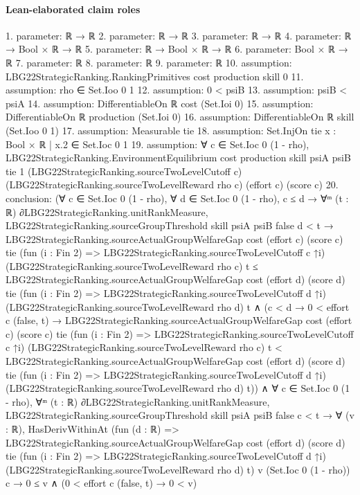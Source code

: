 \documentclass[10pt]{article}
\begin{document}
\paragraph{Lean-elaborated claim roles}\begin{ReviewVerbatim}
1. parameter: ℝ → ℝ
2. parameter: ℝ → ℝ
3. parameter: ℝ → ℝ
4. parameter: ℝ → Bool × ℝ → ℝ
5. parameter: ℝ → Bool × ℝ → ℝ
6. parameter: Bool × ℝ → ℝ
7. parameter: ℝ
8. parameter: ℝ
9. parameter: ℝ
10. assumption: LBG22StrategicRanking.RankingPrimitives cost production skill 0
11. assumption: rho ∈ Set.Ioo 0 1
12. assumption: 0 < psiB
13. assumption: psiB < psiA
14. assumption: DifferentiableOn ℝ cost (Set.Ioi 0)
15. assumption: DifferentiableOn ℝ production (Set.Ioi 0)
16. assumption: DifferentiableOn ℝ skill (Set.Ioo 0 1)
17. assumption: Measurable tie
18. assumption: Set.InjOn tie {x : Bool × ℝ | x.2 ∈ Set.Ioc 0 1}
19. assumption: ∀ c ∈ Set.Ioc 0 (1 - rho),
  LBG22StrategicRanking.EnvironmentEquilibrium cost production skill psiA psiB tie 1
    (LBG22StrategicRanking.sourceTwoLevelCutoff c) (LBG22StrategicRanking.sourceTwoLevelReward rho c) (effort c)
    (score c)
20. conclusion: (∀ c ∈ Set.Ioc 0 (1 - rho),
    ∀ d ∈ Set.Ioc 0 (1 - rho),
      c ≤ d →
        ∀ᵐ (t : ℝ) ∂LBG22StrategicRanking.unitRankMeasure,
          LBG22StrategicRanking.sourceGroupThreshold skill psiA psiB false d < t →
            LBG22StrategicRanking.sourceActualGroupWelfareGap cost (effort c) (score c) tie
                  (fun (i : Fin 2) => LBG22StrategicRanking.sourceTwoLevelCutoff c ↑i)
                  (LBG22StrategicRanking.sourceTwoLevelReward rho c) t ≤
                LBG22StrategicRanking.sourceActualGroupWelfareGap cost (effort d) (score d) tie
                  (fun (i : Fin 2) => LBG22StrategicRanking.sourceTwoLevelCutoff d ↑i)
                  (LBG22StrategicRanking.sourceTwoLevelReward rho d) t ∧
              (c < d →
                0 < effort c (false, t) →
                  LBG22StrategicRanking.sourceActualGroupWelfareGap cost (effort c) (score c) tie
                      (fun (i : Fin 2) => LBG22StrategicRanking.sourceTwoLevelCutoff c ↑i)
                      (LBG22StrategicRanking.sourceTwoLevelReward rho c) t <
                    LBG22StrategicRanking.sourceActualGroupWelfareGap cost (effort d) (score d) tie
                      (fun (i : Fin 2) => LBG22StrategicRanking.sourceTwoLevelCutoff d ↑i)
                      (LBG22StrategicRanking.sourceTwoLevelReward rho d) t)) ∧
  ∀ c ∈ Set.Ioc 0 (1 - rho),
    ∀ᵐ (t : ℝ) ∂LBG22StrategicRanking.unitRankMeasure,
      LBG22StrategicRanking.sourceGroupThreshold skill psiA psiB false c < t →
        ∀ (v : ℝ),
          HasDerivWithinAt
              (fun (d : ℝ) =>
                LBG22StrategicRanking.sourceActualGroupWelfareGap cost (effort d) (score d) tie
                  (fun (i : Fin 2) => LBG22StrategicRanking.sourceTwoLevelCutoff d ↑i)
                  (LBG22StrategicRanking.sourceTwoLevelReward rho d) t)
              v (Set.Ioc 0 (1 - rho)) c →
            0 ≤ v ∧ (0 < effort c (false, t) → 0 < v)
\end{ReviewVerbatim}
\end{document}
